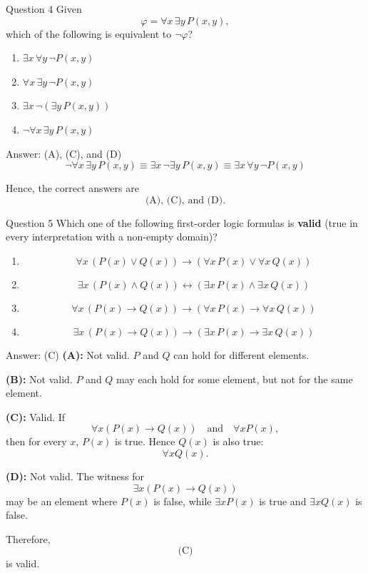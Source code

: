\documentclass[aspectratio=169,11pt]{beamer}
\begin{document}
\begin{frame}{Question 4}
Given
$$
\varphi=\forall x\,\exists y\,P(x,y),
$$
which of the following is equivalent to $\neg\varphi$?

\begin{enumerate}
    \item[(A)] $\exists x\,\forall y\,\neg P(x,y)$
    \item[(B)] $\forall x\,\exists y\,\neg P(x,y)$
    \item[(C)] $\exists x\,\neg(\exists y\,P(x,y))$
    \item[(D)] $\neg\forall x\,\exists y\,P(x,y)$
\end{enumerate}
\begin{block}{Answer: (A), (C), and (D)}
$$
\neg\forall x\,\exists y\,P(x,y)
\equiv
\exists x\,\neg\exists y\,P(x,y)
\equiv
\exists x\,\forall y\,\neg P(x,y)
$$

Hence, the correct answers are
$$
\text{(A), (C), and (D)}.
$$
\end{block}
\end{frame}

\begin{frame}{Question 5}
Which one of the following first-order logic formulas is \textbf{valid}
(true in every interpretation with a non-empty domain)?

\begin{enumerate}
    \item[(A)]
    $$\forall x\,(P(x)\lor Q(x))
    \to
    (\forall x\,P(x)\lor\forall x\,Q(x))$$

    \item[(B)]
    $$\exists x\,(P(x)\land Q(x))
    \leftrightarrow
    (\exists x\,P(x)\land\exists x\,Q(x))$$

    \item[(C)]
    $$\forall x\,(P(x)\to Q(x))
    \to
    (\forall x\,P(x)\to\forall x\,Q(x))$$

    \item[(D)]
    $$\exists x\,(P(x)\to Q(x))
    \to
    (\exists x\,P(x)\to\exists x\,Q(x))$$
\end{enumerate}
\end{frame}

\begin{frame}
\begin{block}{Answer: (C)}
\textbf{(A):} Not valid. $P$ and $Q$ can hold for different elements.

\textbf{(B):} Not valid. $P$ and $Q$ may each hold for some element,
but not for the same element.

\textbf{(C):} Valid. If
$$
\forall x(P(x)\to Q(x))
\quad\text{and}\quad
\forall xP(x),
$$
then for every $x$, $P(x)$ is true. Hence $Q(x)$ is also true:
$$
\forall xQ(x).
$$

\textbf{(D):} Not valid. The witness for
$$
\exists x(P(x)\to Q(x))
$$
may be an element where $P(x)$ is false, while $\exists xP(x)$
is true and $\exists xQ(x)$ is false.

Therefore,
$$
\boxed{\text{(C)}}
$$
is valid.
\end{block}
\end{frame}
\end{document}

